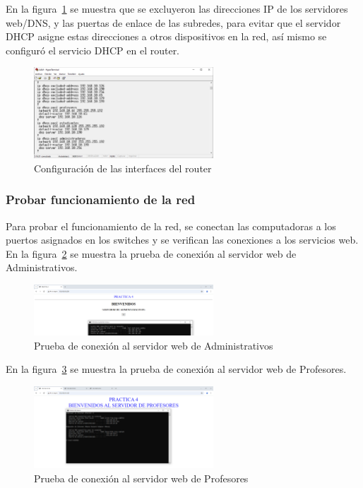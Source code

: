     En la figura~\ref{fig:configurar_router} se muestra que se excluyeron las direcciones IP de los servidores web/DNS, y las puertas de enlace de las subredes, para evitar que el servidor DHCP asigne estas direcciones a otros dispositivos en la red, así mismo se configuró el servicio DHCP en el router.
    \begin{figure}[H]
        \centering
        \includegraphics[width=0.6\textwidth]{img/router.PNG}
        \caption{Configuración de las interfaces del router}
        \label{fig:configurar_router}
    \end{figure}

    \subsubsection*{Probar funcionamiento de la red}

    Para probar el funcionamiento de la red, se conectan las computadoras a los puertos asignados en los switches y se verifican las conexiones a los servicios web. En la figura~\ref{fig:funcionamiento_administrativos} se muestra la prueba de conexión al servidor web de Administrativos.

    \begin{figure}[H]
        \centering
        \includegraphics[width=0.6\textwidth]{img/servidor_administrativos.PNG}
        \caption{Prueba de conexión al servidor web de Administrativos}
        \label{fig:funcionamiento_administrativos}
    \end{figure}

    En la figura~\ref{fig:funcionamiento_profesores} se muestra la prueba de conexión al servidor web de Profesores.

    \begin{figure}[H]
        \centering
        \includegraphics[width=0.6\textwidth]{img/servidor_profesores.PNG}
        \caption{Prueba de conexión al servidor web de Profesores}
        \label{fig:funcionamiento_profesores}
    \end{figure}

